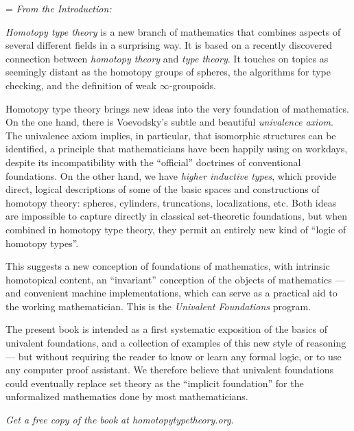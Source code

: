 \pagestyle{empty}

\cleardoublepage
\clearpage

%
\vspace*{0.01\textheight}
{\raggedright
\parindent=0pt
\parskip=\baselineskip
\emph{\OPTbacktitlefont From the Introduction:}
\OPTbackfont

\emph{Homotopy type theory} is a new branch of mathematics that combines aspects of several different fields in a surprising way. It is based on a recently discovered connection between \emph{homotopy theory} and \emph{type theory}.
It touches on topics as seemingly distant as the homotopy groups of spheres, the algorithms for type checking, and the definition of weak $\infty$-groupoids.

Homotopy type theory brings new ideas into the very foundation of mathematics.
On the one hand, there is Voevodsky's subtle and beautiful \emph{univalence axiom}.
The univalence axiom implies, in particular, that isomorphic structures can be identified, a principle that mathematicians have been happily using on workdays, despite its incompatibility with the ``official'' doctrines of conventional foundations.
On the other hand, we have \emph{higher inductive types}, which provide direct, logical descriptions of some of the basic spaces and constructions of homotopy theory: spheres, cylinders, truncations, localizations, etc.
Both ideas are impossible to capture directly in classical set-theoretic foundations, but when combined in homotopy type theory, they permit an entirely new kind of ``logic of homotopy types''.

This suggests a new conception of foundations of mathematics, with intrinsic homotopical content, an ``invariant'' conception of the objects of mathematics --- and convenient machine implementations, which can serve as a practical aid to the working mathematician.
This is the \emph{Univalent Foundations} program.

The present book is intended as a first systematic exposition of the basics of univalent foundations, and a collection of examples of this new style of reasoning --- but without requiring the reader to know or learn any formal logic, or to use any computer proof assistant.
We therefore believe that univalent foundations could eventually replace set theory as the ``implicit foundation'' for the unformalized mathematics done by most mathematicians.

\bigskip

\begin{center}
  \OPTbacktitlefont
  \emph{Get a free copy of the book at homotopytypetheory.org.}
\end{center}
}
\vspace*{0.02\textheight}

